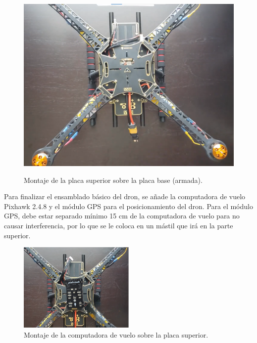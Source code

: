 \begin{figure}[H]
    \centering
    {\includegraphics[width=0.5\linewidth]{imagenes/sup-inf-unidas.png}}
    \caption{Montaje de la placa superior sobre la placa base (armada).}
    \label{fig:lora-solo-parte2}
\end{figure}
\noindent Para finalizar el ensamblado básico del dron, se añade la computadora de vuelo Pixhawk 2.4.8 y el módulo GPS para el posicionamiento del dron.
Para el módulo GPS, debe estar separado mínimo 15 cm de la computadora de vuelo para no causar interferencia, por lo que se le coloca en un mástil que irá en la parte superior.
\begin{figure}[H]
    \centering
    \includegraphics[width=0.5\textwidth]{imagenes/pix-montada.png}
    \caption{Montaje de la computadora de vuelo sobre la placa superior.}
\end{figure}
